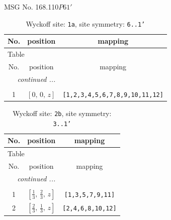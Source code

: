 \documentclass[fleqn,8pt]{jsarticle}
\begin{document}
\setcounter{MaxMatrixCols}{32}

\renewcommand{\tablename}{Table~}
\renewcommand{\figurename}{Figure~}
\begin{center}
\LARGE
MSG No. 168.110\quad$P61'$
\end{center}
\renewcommand{\arraystretch}{1.2}
\begin{longtable}{ccc}
\caption{Wyckoff site: {\tt 1a}, site symmetry: {\tt 6..1'}}
 \\
 \hline \hline
No. & position & mapping \\ \hline \endfirsthead

\multicolumn{2}{l}{\tablename\ \thetable{}} \\
 \hline \hline
No. & position & mapping \\ \hline \endhead

 \hline \hline
\multicolumn{2}{r}{\footnotesize\it continued ...} \\ \endfoot

 \hline \hline
\multicolumn{2}{r}{} \\ \endlastfoot

1 & $\left[ 0,\, 0,\, z \right]$ & {\tt [1,2,3,4,5,6,7,8,9,10,11,12]} \\
\end{longtable}
\renewcommand{\arraystretch}{1.2}
\begin{longtable}{ccc}
\caption{Wyckoff site: {\tt 2b}, site symmetry: {\tt 3..1'}}
 \\
 \hline \hline
No. & position & mapping \\ \hline \endfirsthead

\multicolumn{2}{l}{\tablename\ \thetable{}} \\
 \hline \hline
No. & position & mapping \\ \hline \endhead

 \hline \hline
\multicolumn{2}{r}{\footnotesize\it continued ...} \\ \endfoot

 \hline \hline
\multicolumn{2}{r}{} \\ \endlastfoot

1 & $\left[ \frac{1}{3},\, \frac{2}{3},\, z \right]$ & {\tt [1,3,5,7,9,11]} \\ \hline
2 & $\left[ \frac{2}{3},\, \frac{1}{3},\, z \right]$ & {\tt [2,4,6,8,10,12]} \\
\end{longtable}
\renewcommand{\arraystretch}{1.2}
\end{document}
